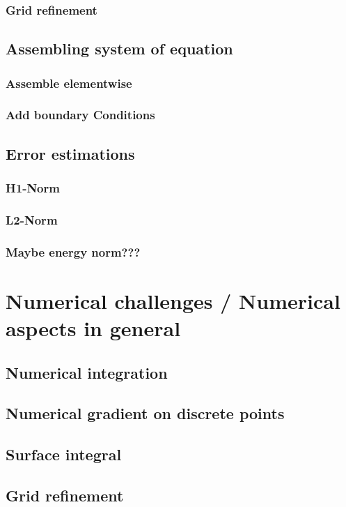 \documentclass[parskip=half, titlepage=yes, 12pt, BCOR=12mm, DIV=calc]{scrartcl}
\begin{document}
\subsubsection{Grid refinement}


\subsection{Assembling system of equation}

\subsubsection{Assemble elementwise}
\subsubsection{Add boundary Conditions}

\subsection{Error estimations}
\subsubsection{H1-Norm}
\subsubsection{L2-Norm}
\subsubsection{Maybe energy norm???}

\newpage


\section{Numerical challenges / Numerical aspects in general}
\subsection{Numerical integration}
\subsection{Numerical gradient on discrete points}
\subsection{Surface integral}
\subsection{Grid refinement}
\end{document}
